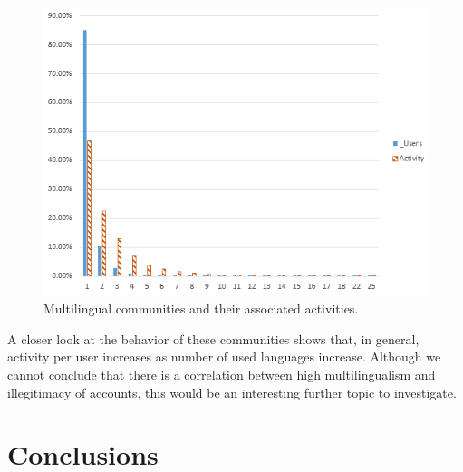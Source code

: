 \begin{figure}[htb]
\centering
\includegraphics[width=\columnwidth]{images/multilingualcommunities.png}
\caption{Multilingual communities and their associated activities.}
\label{fig:multilingual}
\end{figure}

A closer look at the behavior of these communities shows that, in
general, activity per user increases as number of used languages
increase. Although we cannot conclude
that there is a correlation between high multilingualism and
illegitimacy of accounts, this would be an interesting further topic
to investigate.

\section{Conclusions}\label{conclusions}

